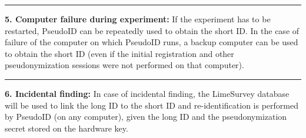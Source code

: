 \par\noindent\rule{\textwidth\color{pniblue}}{0.4pt}
\textbf{5. Computer failure during experiment:}
If the experiment has to be restarted, PseudoID can be repeatedly used to obtain the short ID. In the case of failure of the computer on which PseudoID runs, a backup computer can be used to obtain the short ID (even if the initial registration and other pseudonymization sessions were not performed on that computer).

\par\noindent\rule{\textwidth\color{pniblue}}{0.4pt}
\textbf{6. Incidental finding:} In case of incidental finding, the LimeSurvey database will be used to link the long ID to the short ID and re-identification is performed by PseudoID (on any computer), given the long ID and the pseudonymization secret stored on the hardware key. 